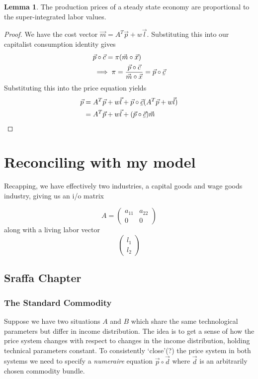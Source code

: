 \documentclass{article}
\newcommand{\ubar}[1]{\underaccent{\bar}{#1}}
\theoremstyle{definition}
\newtheorem{lemma}{Lemma}[section]
\begin{document}
\begin{lemma}
    The production prices of a steady state economy are proportional to the super-integrated labor values.
\end{lemma}

\begin{proof}
    We have the cost vector $\vec{m} = A^T\vec{p}+w\vec{l}$. Substituting this into our capitalist consumption identity gives
    \begin{align}
        & \vec{p}\circ\vec{c} = \pi(\vec{m}\circ\vec{x}) \\
        &\implies \pi = \frac{\vec{p}\circ\vec{c}}{\vec{m}\circ\vec{x}} = \vec{p}\circ \vec{\ubar{c}}
    \end{align}
    Substituting this into the price equation yields 
    \begin{align}
        \vec{p} &= A^T\vec{p}+w\vec{l}+\vec{p}\circ\ubar{\vec{c}}(A^T\vec{p}+w\vec{l}) \\
                &= A^T\vec{p}+w\vec{l}+(\vec{p}\circ\ubar{\vec{c}})\vec{m} \\
    \end{align}
\end{proof}



\section{Reconciling with my model}
Recapping, we have effectively two industries, a capital goods and wage goods industry, giving us an i/o matrix

\[ A = \begin{pmatrix}
    a_{11} & a_{22} \\
    0 & 0 
\end{pmatrix} \]
along with a living labor vector
\[
    \begin{pmatrix}
        l_1 \\ l_2
    \end{pmatrix}
\]

\subsection{Sraffa Chapter}

\subsubsection{The Standard Commodity}
Suppose we have two situations $A$ and $B$ which share the same technological parameters but differ in income distribution. The idea is to get a sense of how the price system changes with respect to changes in the income distribution, holding technical parameters constant. To consistently `close'(?) the price system in both systems we need to specify a \emph{numeraire} equation $\vec{p}\circ\vec{d}$ where $\vec{d}$ is an arbitrarily chosen commodity bundle. 
\end{document}
